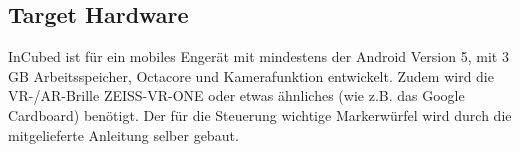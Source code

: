 \subsection{Target Hardware}

InCubed ist für ein mobiles Engerät mit mindestens der Android Version 5, mit 3 GB Arbeitsspeicher, Octacore und Kamerafunktion entwickelt. Zudem wird die VR-/AR-Brille ZEISS-VR-ONE oder etwas ähnliches (wie z.B. das Google Cardboard) benötigt. Der für die Steuerung wichtige Markerwürfel wird durch die mitgelieferte Anleitung selber gebaut.